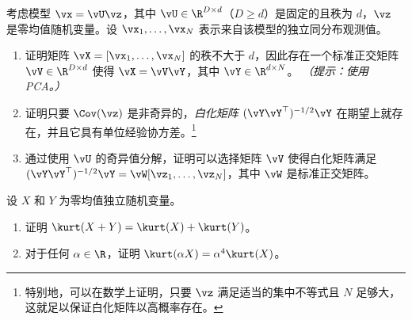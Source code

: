 \documentclass[../../book-main_zh.tex]{subfiles}
\begin{document}
\begin{exercise}\label{exercise:whitening}
    考虑模型 $\vx = \vU \vz$，其中 $\vU \in \R^{D \times
    d}$（$D \geq d$）是固定的且秩为 $d$，$\vz$ 是零均值随机变量。设 $\vx_1, \dots, \vx_N$
    表示来自该模型的独立同分布观测值。
    \begin{enumerate}
        \item 证明矩阵 $\vX = [\vx_1, \dots, \vx_N]$ 的秩不大于
            $d$，因此存在一个标准正交矩阵 $\vV \in \R^{D \times d}$ 使得 $\vX
            = \vV \vY$，其中 $\vY \in \R^{d \times N}$。
            \textit{（提示：使用 PCA。）}
        \item 证明只要 $\Cov(\vz)$ 是非奇异的，\textit{白化矩阵} $(\vY
            \vY^\top)^{-1/2}\vY$
            在期望上就存在，并且它具有单位经验协方差。\footnote{特别地，可以在数学上证明，只要 $\vz$
            满足适当的集中不等式且 $N$ 足够大，这就足以保证白化矩阵以高概率存在。}
        \item 通过使用 $\vU$ 的奇异值分解，证明可以选择矩阵 $\vV$ 使得白化矩阵满足 $(\vY
            \vY^\top)^{-1/2} \vY =
            \vW [\vz_1, \dots, \vz_N]$，其中 $\vW$ 是标准正交矩阵。
    \end{enumerate}
\end{exercise}

\begin{exercise}\label{exercise:kurtosis-linearity-properties}
    设 $X$ 和 $Y$ 为零均值独立随机变量。
    \begin{enumerate}
        \item 证明 $\kurt(X + Y) = \kurt(X) + \kurt(Y)$。
        \item 对于任何 $\alpha \in \R$，证明 $\kurt(\alpha X) =
            \alpha^4 \kurt(X)$。
    \end{enumerate}
\end{exercise}
\end{document}
